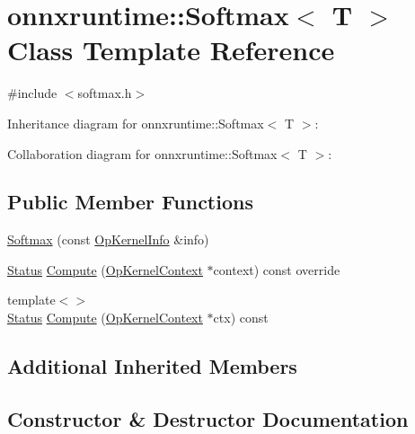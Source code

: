 \hypertarget{classonnxruntime_1_1Softmax}{}\section{onnxruntime\+:\+:Softmax$<$ T $>$ Class Template Reference}
\label{classonnxruntime_1_1Softmax}


{\ttfamily \#include $<$softmax.\+h$>$}



Inheritance diagram for onnxruntime\+:\+:Softmax$<$ T $>$\+:


Collaboration diagram for onnxruntime\+:\+:Softmax$<$ T $>$\+:
\subsection*{Public Member Functions}
\begin{DoxyCompactItemize}
\item 
\mbox{\hyperlink{classonnxruntime_1_1Softmax_a2aa9e94ae116c2139f17b8779bff28c2}{Softmax}} (const \mbox{\hyperlink{classonnxruntime_1_1OpKernelInfo}{Op\+Kernel\+Info}} \&info)
\item 
\mbox{\hyperlink{classonnxruntime_1_1common_1_1Status}{Status}} \mbox{\hyperlink{classonnxruntime_1_1Softmax_a98fb9dfe120c3c2451251957ca40b0e4}{Compute}} (\mbox{\hyperlink{classonnxruntime_1_1OpKernelContext}{Op\+Kernel\+Context}} $\ast$context) const override
\item 
{\footnotesize template$<$$>$ }\\\mbox{\hyperlink{classonnxruntime_1_1common_1_1Status}{Status}} \mbox{\hyperlink{classonnxruntime_1_1Softmax_a363ef1859042443541111bcee368a8ea}{Compute}} (\mbox{\hyperlink{classonnxruntime_1_1OpKernelContext}{Op\+Kernel\+Context}} $\ast$ctx) const
\end{DoxyCompactItemize}
\subsection*{Additional Inherited Members}


\subsection{Constructor \& Destructor Documentation}
\mbox{\label{classonnxruntime_1_1Softmax_a2aa9e94ae116c2139f17b8779bff28c2}} 
